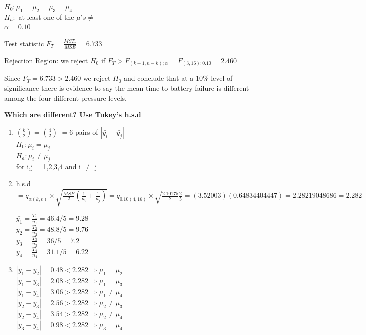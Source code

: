 \documentclass{article}
\begin{document}
\begin{enumerate}[1.]
$H_0: \mu_1 = \mu_2 = \mu_3 = \mu_4$ \\
$H_a:$ at least one of the $\mu's \neq$ \\
$\alpha = 0.10$

Test statistic $F_T = \frac{MST_r}{MSE} = 6.733$

Rejection Region: we reject $H_0$ if $F_T > F_{(k-1, n-k);\alpha} = F_{(3, 16);0.10} = 2.460$

Since $F_T = 6.733 > 2.460$ we reject $H_0$ and conclude that at a 10\% level of significance there is evidence to say the mean time to battery failure is different among the four different pressure levels.

\textbf{Which are different? Use Tukey's h.s.d}

\begin{enumerate}[1)]

\item $k \choose 2 $ = $4 \choose 2$ $= 6$ pairs of $|\bar{y_i} - \bar{y_j}|$ \\
$H_0: \mu_i = \mu_j$ \\
$H_a: \mu_i \neq \mu_j$ \\
for i,j = 1,2,3,4 and i $\neq$ j

\item h.s.d $ = q_{\alpha(k ,v)} \times \sqrt{ \frac{MSE}{2}( \frac{1}{n_i} + \frac{1}{n_j}) } = q_{0.10(4, 16)} \times \sqrt{ \frac{2.10175}{2}\frac{2}{5}} = (3.52003)(0.64834404447) = 2.28219048686 = 2.282 $

$\bar{y_1} = \frac{T_1}{n_1} = 46.4/5 = 9.28$\\
$\bar{y_2} = \frac{T_2}{n_2} = 48.8/5 = 9.76$\\
$\bar{y_3} = \frac{T_3}{n_3} = 36/5 = 7.2$\\
$\bar{y_4} = \frac{T_4}{n_4} = 31.1/5 = 6.22$\\

\item $| \bar{y_1} - \bar{y_2} | = 0.48 < 2.282 \Rightarrow \mu_1 = \mu_2$ \\
$| \bar{y_1} - \bar{y_3} | = 2.08 < 2.282 \Rightarrow \mu_1 = \mu_3$ \\
$| \bar{y_1} - \bar{y_4} | = 3.06 > 2.282 \Rightarrow \mu_1 \neq \mu_4$ \\
$| \bar{y_2} - \bar{y_3} | = 2.56 > 2.282 \Rightarrow \mu_2 \neq \mu_3$ \\
$| \bar{y_2} - \bar{y_4} | = 3.54 > 2.282 \Rightarrow \mu_2 \neq \mu_4$ \\
$| \bar{y_3} - \bar{y_4} | = 0.98 < 2.282 \Rightarrow \mu_3 = \mu_4$ \\


\end{enumerate}
\end{enumerate}
\end{document}
